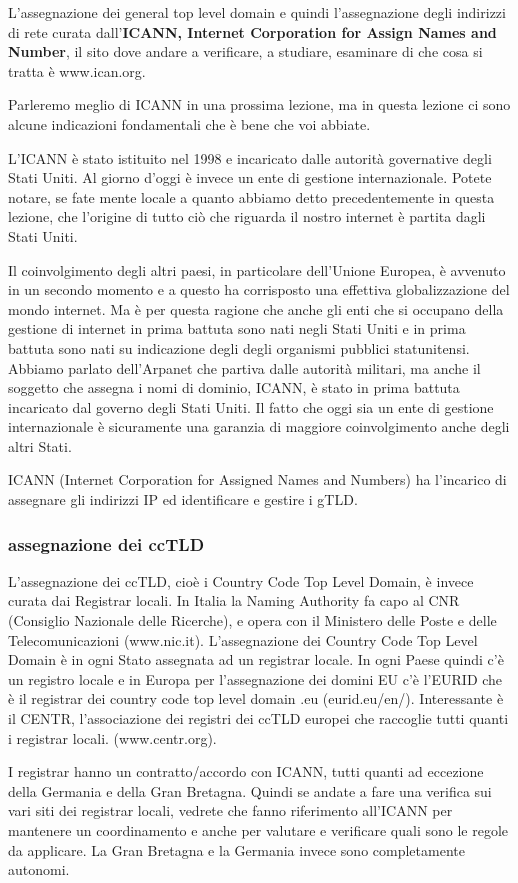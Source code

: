 L'assegnazione dei general top level domain e quindi l'assegnazione degli indirizzi di rete curata dall'\textbf{ICANN, Internet Corporation for Assign Names and Number}, il sito dove andare a verificare, a studiare, esaminare di che cosa si tratta è www.ican.org. \par
Parleremo meglio di ICANN in una prossima lezione, ma in questa lezione ci sono alcune indicazioni fondamentali che è bene che voi abbiate.\par
L'ICANN è stato istituito nel 1998 e incaricato dalle autorità governative degli Stati Uniti. Al giorno d'oggi è invece un ente di gestione internazionale. Potete notare, se fate mente locale a quanto abbiamo detto precedentemente in questa lezione, che l'origine di tutto ciò che riguarda il nostro internet è partita dagli Stati Uniti.\par
Il coinvolgimento degli altri paesi, in particolare dell'Unione Europea, è avvenuto in un secondo momento e a questo ha corrisposto una effettiva globalizzazione del mondo internet. Ma è per questa ragione che anche gli enti che si occupano della gestione di internet in prima battuta sono nati negli Stati Uniti e in prima battuta sono nati su indicazione degli degli organismi pubblici statunitensi. Abbiamo parlato dell'Arpanet che partiva dalle autorità militari, ma anche il soggetto che assegna i nomi di dominio, ICANN, è stato in prima battuta incaricato dal governo degli Stati Uniti. Il fatto che oggi sia un ente di gestione internazionale è sicuramente una garanzia di maggiore coinvolgimento anche degli altri Stati.\par
ICANN (Internet Corporation for Assigned Names and Numbers) ha l'incarico di assegnare gli indirizzi IP ed identificare e gestire i gTLD.
\subsubsection{assegnazione dei ccTLD}
L'assegnazione dei ccTLD, cioè i Country Code Top Level Domain, è invece curata dai Registrar locali. In Italia la Naming Authority fa capo al CNR (Consiglio Nazionale delle Ricerche), e opera con il Ministero delle Poste e delle Telecomunicazioni (www.nic.it). L'assegnazione dei Country Code Top Level Domain è in ogni Stato assegnata ad un registrar locale. In ogni Paese quindi c'è un registro locale e in Europa per l'assegnazione dei domini EU c'è l'EURID che è il registrar dei country code top level domain .eu (eurid.eu/en/).
Interessante è il CENTR, l'associazione dei registri dei ccTLD europei che raccoglie tutti quanti i registrar locali. (www.centr.org).\par
I registrar hanno un contratto/accordo con ICANN, tutti quanti ad eccezione della Germania e della Gran Bretagna. Quindi se andate a fare una verifica sui vari siti dei registrar locali, vedrete che fanno riferimento all'ICANN per mantenere un coordinamento e anche per valutare e verificare quali sono le regole da applicare. La Gran Bretagna e la Germania invece sono completamente autonomi.
